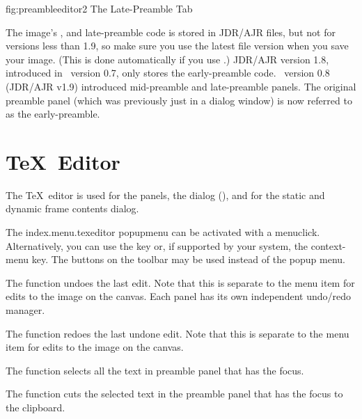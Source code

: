 \FloatFig
  {fig:preambleeditor2}
  {}
  {The Late-Preamble Tab}

The image's ,  and
\gls{late-preamble} code is stored in \gls{JDR}\slash \gls{AJR}
files, but not for versions less than 1.9, so make sure you use the
latest file version when you save your image. (This is done
automatically if you use .) \gls{JDR}\slash\gls{AJR}
version 1.8, introduced in \FlowframTk\ version 0.7, only stores the
\gls{early-preamble} code.  \FlowframTk\ version 0.8
(\gls{JDR}\slash\gls{AJR} v1.9) introduced \gls{mid-preamble} and
\gls{late-preamble} panels. The original preamble panel (which was
previously just in a dialog window) is now referred to as the
\gls{early-preamble}.

\section{\TeX\ Editor}\label{sec:texeditor}

The \TeX\ editor is used for the  panels,
the  dialog (),
and for the static and dynamic frame contents dialog.


The \gls{index.menu.texeditor} \gls*{popupmenu} can be activated with a \gls{menuclick}.
Alternatively, you can use the  key or, if supported by your
system, the  \gls{context-menu} key.
The buttons on the toolbar may be used instead of the popup menu.

%
The  function undoes the last edit. Note that
this is separate to the  menu item for edits to the
image on the \gls{canvas}. Each panel has its own independent
undo\slash redo manager.

%
The  function redoes the last undone edit. Note that
this is separate to the  menu item for edits to the
image on the \gls{canvas}.

%
The  function selects all the text in
preamble panel that has the focus.

%
The  function cuts the selected text in the
preamble panel that has the focus to the clipboard.

